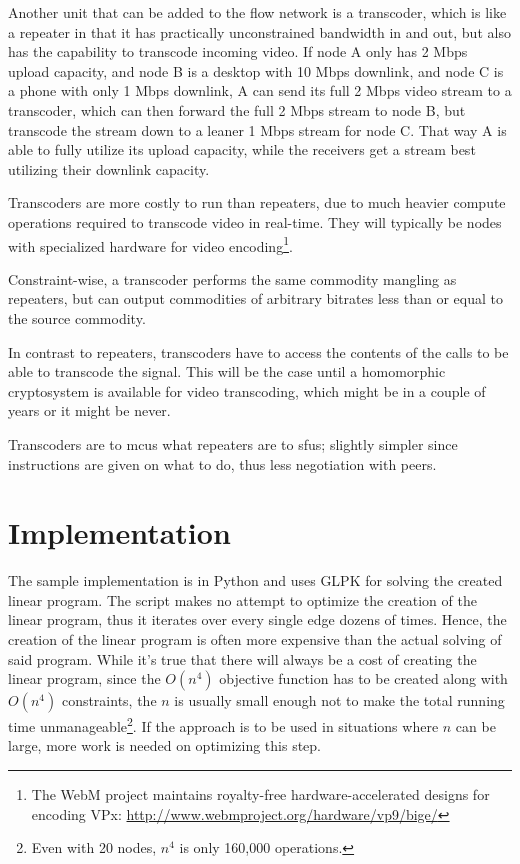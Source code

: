 Another unit that can be added to the flow network is a transcoder, which is like a repeater in that it has practically unconstrained bandwidth in and out, but also has the capability to transcode incoming video. If node A only has 2 Mbps upload capacity, and node B is a desktop with 10 Mbps downlink, and node C is a phone with only 1 Mbps downlink, A can send its full 2 Mbps video stream to a transcoder, which can then forward the full 2 Mbps stream to node B, but transcode the stream down to a leaner 1 Mbps stream for node C. That way A is able to fully utilize its upload capacity, while the receivers get a stream best utilizing their downlink capacity.

Transcoders are more costly to run than repeaters, due to much heavier compute operations required to transcode video in real-time. They will typically be nodes with specialized hardware for video encoding\footnote{The WebM project maintains royalty-free hardware-accelerated designs for encoding VPx: \url{http://www.webmproject.org/hardware/vp9/bige/}}.

Constraint-wise, a transcoder performs the same commodity mangling as repeaters, but can output commodities of arbitrary bitrates less than or equal to the source commodity.

In contrast to repeaters, transcoders have to access the contents of the calls to be able to transcode the signal. This will be the case until a homomorphic cryptosystem is available for video transcoding, which might be in a couple of years or it might be never.

Transcoders are to \glspl{mcu} what repeaters are to \glspl{sfu}; slightly simpler since instructions are given on what to do, thus less negotiation with peers.


\section{Implementation}\label{sec:implementation}

The sample implementation is in Python and uses GLPK for solving the created linear program. The script makes no attempt to optimize the creation of the linear program, thus it iterates over every single edge dozens of times. Hence, the creation of the linear program is often more expensive than the actual solving of said program. While it's true that there will always be a cost of creating the linear program, since the $O(n^4)$ objective function has to be created along with $O(n^4)$ constraints, the $n$ is usually small enough not to make the total running time unmanageable\footnote{Even with 20 nodes, $n^4$ is only 160,000 operations.}. If the approach is to be used in situations where $n$ can be large, more work is needed on optimizing this step.

